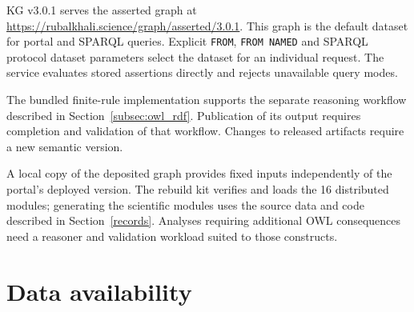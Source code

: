 \begin{revision}
KG v3.0.1 serves the asserted graph at
\url{https://rubalkhali.science/graph/asserted/3.0.1}.
This graph is the default dataset for portal and SPARQL queries.
Explicit \texttt{FROM}, \texttt{FROM NAMED} and SPARQL protocol
dataset parameters select the dataset for an individual request.
The service evaluates stored assertions directly and rejects
unavailable query modes.

The bundled finite-rule implementation supports the separate
reasoning workflow described in Section~\ref{subsec:owl_rdf}.
Publication of its output requires completion and validation of that
workflow. Changes to released artifacts require a new semantic version.

A local copy of the deposited graph provides fixed inputs independently
of the portal's deployed version. The rebuild kit verifies and loads the
16 distributed modules; generating the scientific modules uses the source
data and code described in Section~\ref{records}. Analyses requiring
additional OWL consequences need a reasoner and validation workload
suited to those constructs.


\section{Data availability}\label{data_availability}


\end{revision}
